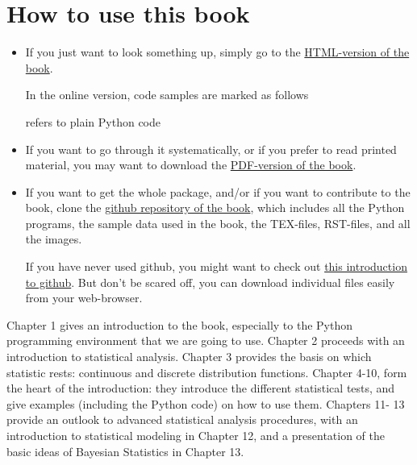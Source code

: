 \section*{How to use this book}

\begin{itemize}
  \item If you just want to look something up, simply go to the \href{http://work.thaslwanter.at/Stats/html} {HTML-version of the book}.

   In the online version, code samples are marked as follows

     refers to plain Python code

  \item If you want to go through it systematically, or if you prefer to read
   printed material, you may want to download the \href{http://work.thaslwanter.at/Stats/StatsIntro.pdf} {PDF-version of the book}.

  \item If you want to get the whole package, and/or if you want to
   contribute to the book, clone the  \href{https://github.com/thomas-haslwanter/statsintro} {github repository of the
   book}, which  includes all the Python programs, the sample data used in the book,
   the TEX-files, RST-files, and all the images.

   If you have never used github, you might want to check out \href{https://help.github.com/articles/set-up-git} {this
   introduction to  github}. But don't be  scared off, you can download individual files easily from your
   web-browser.

\end{itemize}

Chapter 1 gives an introduction to the book, especially to the Python programming environment that we are going to use. Chapter 2 proceeds with an introduction to statistical analysis. Chapter 3 provides the basis on which statistic rests: continuous and discrete distribution functions. Chapter 4-10, form the heart of the introduction: they introduce the different statistical tests, and give examples (including the Python code) on how to use them. Chapters 11- 13 provide an outlook to advanced statistical analysis procedures, with an introduction to statistical modeling in Chapter 12, and a presentation of the basic ideas of Bayesian Statistics in Chapter 13.

